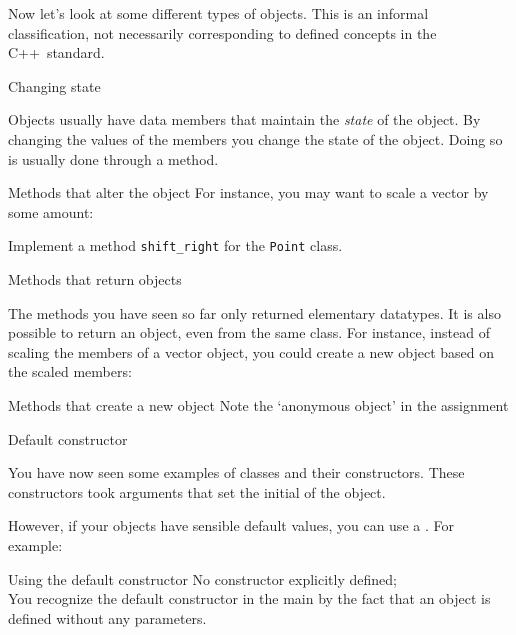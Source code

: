 Now let's look at some different types of objects.
This is an informal classification, not necessarily
corresponding to defined concepts in the C++~standard.

 {Changing state}

Objects usually have data members that maintain the
\emph{state} of the object.
By changing the
values of the members you change the state of the object.
Doing so is
usually done through a method.

\begin{block}{Methods that alter the object}
  \label{sl:obj-func-on}
  For instance, you may want to scale a vector by some amount:
\end{block}

\begin{exercise}
  \label{ex:shift-point-right}
  Implement a method \lstinline+shift_right+ for the \lstinline{Point} class.
\end{exercise}

 {Methods that return objects}

The methods you have seen so far only returned elementary
datatypes. It is also possible to return an object, even from the same
class. For instance, instead of scaling the members of a vector object, you
could create a new object based on the scaled members:
%

\begin{slide}{Methods that create a new object}
  \label{sl:obj-return}
  Note the `anonymous object' in the assignment
\end{slide}

 {Default constructor}
\label{sec:default-constructor}

You have now seen some examples of classes and their constructors.
These constructors took arguments that set the initial  of the object.

However, if your objects have sensible default values, you can use a
.
For example:

\begin{block}{Using the default constructor}
  \label{sl:no-construct-default}
  No constructor explicitly defined;\\
  You recognize the default constructor in the main by the fact that an object
  is defined without any parameters.


\end{block}

